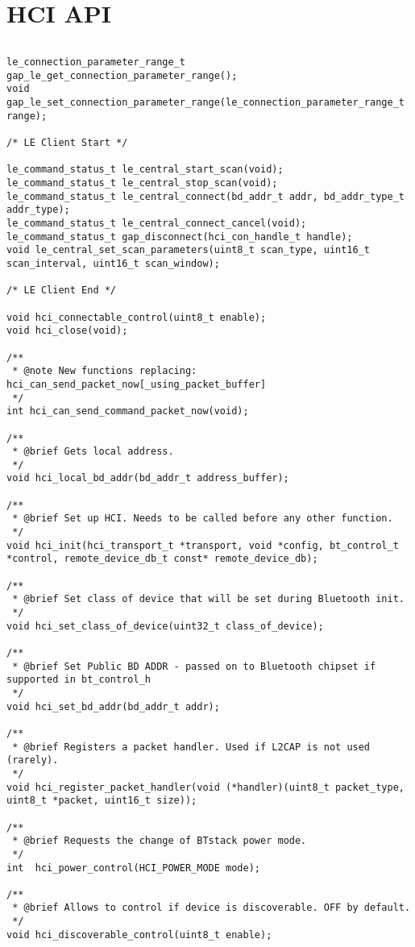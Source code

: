 \section{HCI API}
\label{appendix:api_hci}
$ $
\begin{lstlisting}
le_connection_parameter_range_t gap_le_get_connection_parameter_range();
void gap_le_set_connection_parameter_range(le_connection_parameter_range_t range);

/* LE Client Start */

le_command_status_t le_central_start_scan(void);
le_command_status_t le_central_stop_scan(void);
le_command_status_t le_central_connect(bd_addr_t addr, bd_addr_type_t addr_type);
le_command_status_t le_central_connect_cancel(void);
le_command_status_t gap_disconnect(hci_con_handle_t handle);
void le_central_set_scan_parameters(uint8_t scan_type, uint16_t scan_interval, uint16_t scan_window);

/* LE Client End */
    
void hci_connectable_control(uint8_t enable);
void hci_close(void);

/** 
 * @note New functions replacing: hci_can_send_packet_now[_using_packet_buffer]
 */
int hci_can_send_command_packet_now(void);
    
/**
 * @brief Gets local address.
 */
void hci_local_bd_addr(bd_addr_t address_buffer);

/**
 * @brief Set up HCI. Needs to be called before any other function.
 */
void hci_init(hci_transport_t *transport, void *config, bt_control_t *control, remote_device_db_t const* remote_device_db);

/**
 * @brief Set class of device that will be set during Bluetooth init.
 */
void hci_set_class_of_device(uint32_t class_of_device);

/**
 * @brief Set Public BD ADDR - passed on to Bluetooth chipset if supported in bt_control_h
 */
void hci_set_bd_addr(bd_addr_t addr);

/**
 * @brief Registers a packet handler. Used if L2CAP is not used (rarely). 
 */
void hci_register_packet_handler(void (*handler)(uint8_t packet_type, uint8_t *packet, uint16_t size));

/**
 * @brief Requests the change of BTstack power mode.
 */
int  hci_power_control(HCI_POWER_MODE mode);

/**
 * @brief Allows to control if device is discoverable. OFF by default.
 */
void hci_discoverable_control(uint8_t enable);


\end{lstlisting}
